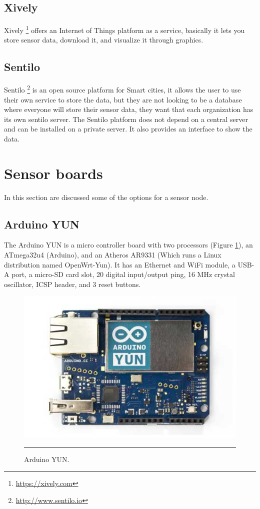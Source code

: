 \documentclass[12pt, a4paper,twoside]{tesi_upf}
\begin{document}
    \subsection{Xively}
      Xively \footnote{\url{https://xively.com}} offers an Internet of Things platform as a service, basically it lets you store sensor data, download it, and visualize it through graphics.
    
    \subsection{Sentilo}
      Sentilo \footnote{\url{http://www.sentilo.io}} is an open source platform for Smart cities, it allows the user to use their own service to store the data, but they are not looking to be a database where everyone will store their sensor data, they want that each organization has its own sentilo server. The Sentilo platform does not depend on a central server and can be installed on a private server. It also provides an interface to show the data.
    
  \section{Sensor boards}
    In this section are discussed some of the options for a sensor node.
    
    \subsection{Arduino YUN}
      The Arduino YUN is a micro controller board with two processors (Figure \ref{fig:AYUN}), an ATmega32u4 (Arduino), and an Atheros AR9331 (Which runs a Linux distribution named OpenWrt-Yun). It has an Ethernet and WiFi module, a USB-A port, a micro-SD card slot, 20 digital input/output ping, 16 MHz crystal oscillator, ICSP header, and 3 reset buttons.
      \begin{figure}[htbp]
        \centering
            \includegraphics[scale=0.4]{./Figures/ArduinoYunFront_2_450px.jpg}
            \\
            \rule{15em}{0.5pt}
        \caption[Arduino YUN]{Arduino YUN.}
        \label{fig:AYUN}
      \end{figure}
      
\end{document}
